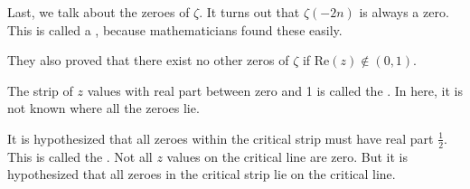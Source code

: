 \documentclass[11pt, oneside]{amsart}
\begin{document}
\begin{remark}
  Last, we talk about the zeroes of $\zeta$. It turns out that
  $\zeta(-2n)$ is always a zero. This is called a ,
  because mathematicians found these easily.

  They also proved that there exist no other zeros of $\zeta$ if
  $\text{Re}(z) \not\in (0, 1)$.

  The strip of $z$ values with real part between zero and 1 is called
  the . In here, it is not known where all the
  zeroes lie.

  It is hypothesized that all zeroes within the critical strip must have
  real part $\frac{1}{2}$. This is called the .
  Not all $z$ values on the critical line are zero. But it is
  hypothesized that all zeroes in the critical strip lie on the critical
  line.
\end{remark}
\end{document}
